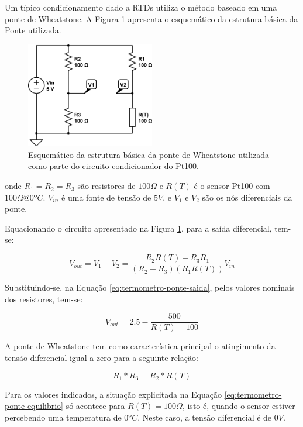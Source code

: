 \documentclass[a4paper]{instrumentacao}
\begin{document}
Um típico condicionamento dado a RTDs utiliza o método baseado em uma ponte de Wheatstone. A Figura \ref{fig:termometro-ponte} apresenta o esquemático da estrutura básica da Ponte utilizada.

\begin{figure}[H]
	\centering \includegraphics[width=0.5\textwidth]{pt100-ponte.png}
	\caption{Esquemático da estrutura básica da ponte de Wheatstone utilizada como parte do circuito condicionador do Pt100.}
	\label{fig:termometro-ponte}
\end{figure}

\noindent onde $R_1=R_2=R_3$ são resistores de $100\Omega$ e $R(T)$ é o sensor Pt100 com $100\Omega@0ºC$. $V_{in}$ é uma fonte de tensão de $5V$, e $V_1$ e $V_2$ são os nós diferenciais da ponte.

Equacionando o circuito apresentado na Figura \ref{fig:termometro-ponte}, para a saída diferencial, tem-se:

\begin{equation}
	V_{out}=V_1-V_2=\frac{R_2R(T)-R_3R_1}{(R_2+R_3)(R_1R(T))}V_{in}
	\label{eq:termometro-ponte-saida}
\end{equation}

Substituindo-se, na Equação \ref{eq:termometro-ponte-saida}, pelos valores nominais dos resistores, tem-se:

\begin{equation}
	V_{out}=2.5-\frac{500}{R(T)+100}
	\label{eq:termometro-ponte-saida-valores}
\end{equation}

A ponte de Wheatstone tem como característica principal o atingimento da tensão diferencial igual a zero para a seguinte relação:

 \begin{equation}
	R_1*R_3=R_2*R(T)
	\label{eq:termometro-ponte-equilibrio}
\end{equation}

Para os valores indicados, a situação explicitada na Equação \ref{eq:termometro-ponte-equilibrio} só acontece para $R(T)=100\Omega$, isto é, quando o sensor estiver percebendo uma temperatura de $0ºC$. Neste caso, a tensão diferencial é de $0V$.
\end{document}
